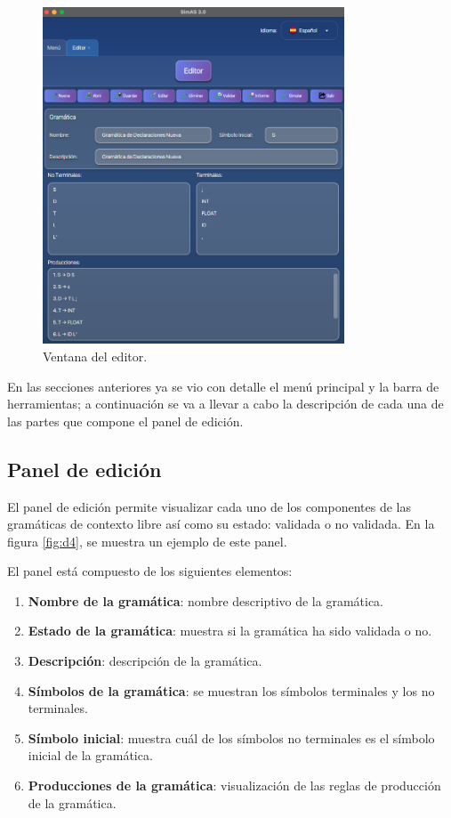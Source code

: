\begin{figure}[htp]
\centering
	\includegraphics[width=0.8\textwidth]{figuras2/ejemplo_practico/editor.png}
	\caption{Ventana del editor.}
	\label{fig:d3}
\end{figure}

En las secciones anteriores ya se vio con detalle el menú principal y la barra de herramientas; a continuación se va a llevar a cabo la descripción de cada una de las partes que compone el panel de edición.

\subsection{Panel de edición}

El panel de edición permite visualizar cada uno de los componentes de las gramáticas de contexto libre así como su estado: validada o no validada. En la figura \ref{fig:d4}, se muestra un ejemplo de este panel.

El panel está compuesto de los siguientes elementos:
\begin{enumerate}
 \item \textbf{Nombre de la gramática}: nombre descriptivo de la gramática.
  \item \textbf{Estado de la gramática}: muestra si la gramática ha sido validada o no.
  \item \textbf{Descripción}: descripción de la gramática.
 \item \textbf{Símbolos de la gramática}: se muestran los símbolos terminales y los no terminales.
 \item \textbf{Símbolo inicial}: muestra cuál de los símbolos no terminales es el símbolo inicial de la gramática.
 \item \textbf{Producciones de la gramática}: visualización de las reglas de producción de la gramática.
 \end{enumerate}

